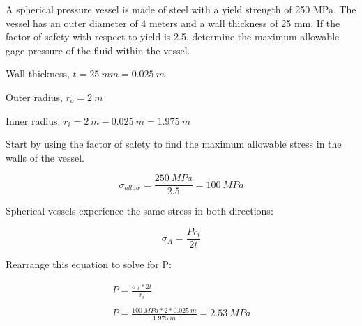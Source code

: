 \documentclass[
  letterpaper,
  DIV=11,
  numbers=noendperiod]{scrreprt}
\theoremstyle{definition}
\theoremstyle{remark}
\begin{document}
\begin{tcolorbox}[enhanced jigsaw, leftrule=.75mm, colbacktitle=quarto-callout-tip-color!10!white, breakable, opacityback=0, colback=white, titlerule=0mm, toprule=.15mm, colframe=quarto-callout-tip-color-frame, coltitle=black, title={Example 13.3}, toptitle=1mm, bottomrule=.15mm, rightrule=.15mm, left=2mm, arc=.35mm, opacitybacktitle=0.6, bottomtitle=1mm]

A spherical pressure vessel is made of steel with a yield strength of
250 MPa. The vessel has an outer diameter of 4 meters and a wall
thickness of 25 mm. If the factor of safety with respect to yield is
2.5, determine the maximum allowable gage pressure of the fluid within
the vessel.

\begin{tcolorbox}[enhanced jigsaw, leftrule=.75mm, colbacktitle=quarto-callout-tip-color!10!white, breakable, opacityback=0, colback=white, titlerule=0mm, toprule=.15mm, colframe=quarto-callout-tip-color-frame, coltitle=black, title={Solution}, toptitle=1mm, bottomrule=.15mm, rightrule=.15mm, left=2mm, arc=.35mm, opacitybacktitle=0.6, bottomtitle=1mm]

Wall thickness, \(𝑡 = 25{~𝑚𝑚} = 0.025{~𝑚}\)

Outer radius, \(r_o = 2{~m}\)

Inner radius, \(r_i= 2{~m} - 0.025{~m} = 1.975{~m}\)

Start by using the factor of safety to find the maximum allowable stress
in the walls of the vessel.

\[
\sigma_{allow}=\frac{250{~MPa}}{2.5}=100{~MPa}
\]

Spherical vessels experience the same stress in both directions:

\[
\sigma_A=\frac{P r_i}{2 t}
\]

Rearrange this equation to solve for P:

\[
\begin{gathered}
P=\frac{\sigma_A * 2 t}{r_i} \\
\\
P=\frac{100{~MPa}*2*0.025{~m}}{1.975{~m}}=2.53{~MPa}
\end{gathered}
\]

\end{tcolorbox}

\end{tcolorbox}
\end{document}
